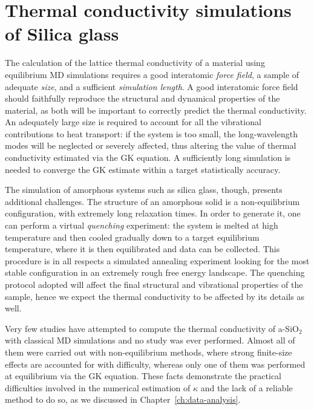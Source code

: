 \chapter{Thermal conductivity simulations of Silica glass}  \label{ch:silica}


The calculation of the lattice thermal conductivity of a material using equilibrium MD simulations requires a good interatomic \emph{force field}, a sample of adequate \emph{size}, and a sufficient \emph{simulation length}. 
A good interatomic force field should faithfully reproduce the structural and dynamical properties of the material, as both will be important to correctly predict the thermal conductivity. 
An adequately large size is required to account for all the vibrational contributions to heat transport: if the system is too small, the long-wavelength modes will be neglected or severely affected, thus altering the value of thermal conductivity estimated via the GK equation. 
A sufficiently long simulation is needed to converge the GK estimate within a target statistically accuracy. 

The simulation of amorphous systems such as silica glass, though, presents additional challenges. The structure of an amorphous solid is a non-equilibrium configuration, with extremely long relaxation times. 
In order to generate it, one can perform a virtual \emph{quenching} experiment: the system is melted at high temperature and then cooled gradually down to a target equilibrium temperature, where it is then equilibrated and data can be collected. 
This procedure is in all respects a simulated annealing experiment looking for the most stable configuration in an extremely rough free energy landscape. 
The quenching protocol adopted will affect the final structural and vibrational properties of the sample, hence we expect the thermal conductivity to be affected by its details as well. 

Very few studies have attempted to compute the thermal conductivity of a-SiO$_2$ with classical MD simulations and no \abinitio study was ever performed. Almost all of them were carried out with non-equilibrium methods, where strong finite-size effects are accounted for with difficulty, whereas only one of them was performed at equilibrium via the GK equation. 
These facts demonstrate the practical difficulties involved in the numerical estimation of $\kappa$ and the lack of a reliable method to do so, as we discussed in Chapter~\ref{ch:data-analysis}. 

